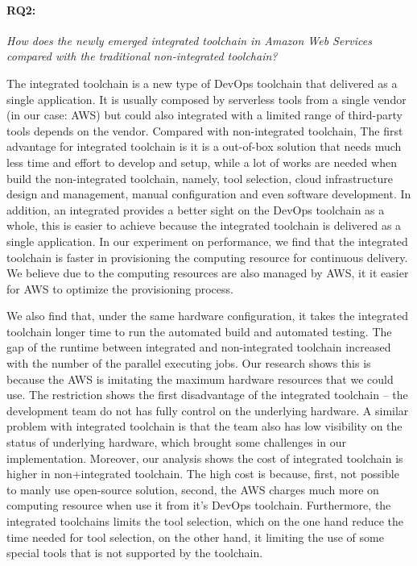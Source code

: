 \paragraph{RQ2:} \textit{How does the newly emerged integrated toolchain in Amazon Web Services compared with the traditional non-integrated toolchain?}
\medskip
\par
The integrated toolchain is a new type of DevOps toolchain that delivered as a single application. It is usually composed by serverless tools from a single vendor (in our case: AWS) but could also integrated with a limited range of third-party tools depends on the vendor. Compared with non-integrated toolchain, The first advantage for integrated toolchain is it is a out-of-box solution that needs much less time and effort to develop and setup, while a lot of works are needed when build the non-integrated toolchain, namely, tool selection, cloud infrastructure design and management, manual configuration and even software development. In addition, an integrated provides a better sight on the DevOps toolchain as a whole, this is easier to achieve because the integrated toolchain is delivered as a single application. In our experiment on performance, we find that the integrated toolchain is faster in provisioning the computing resource for continuous delivery. We believe due to the computing resources are also managed by AWS, it it easier for AWS to optimize the provisioning process.
\par
We also find that, under the same hardware configuration, it takes the integrated toolchain longer time to run the automated build and automated testing. The gap of the runtime between integrated and non-integrated toolchain increased with the number of the parallel executing jobs.
Our research shows this is because the AWS is imitating the maximum hardware resources that we could use. The restriction shows the first disadvantage of the integrated toolchain -- the development team do not has fully control on the underlying hardware. A similar problem with integrated toolchain is that the team also has low visibility on the status of underlying hardware, which brought some challenges in our implementation. Moreover, our analysis shows the cost of integrated toolchain is higher in non+integrated toolchain. The high cost is because, first, not possible to manly use open-source solution, second, the AWS charges much more on computing resource when use it from it's DevOps toolchain.
Furthermore, the integrated toolchains limits the tool selection, which on the one hand reduce the time needed for tool selection, on the other hand, it limiting the use of some special tools that is not supported by the toolchain.
